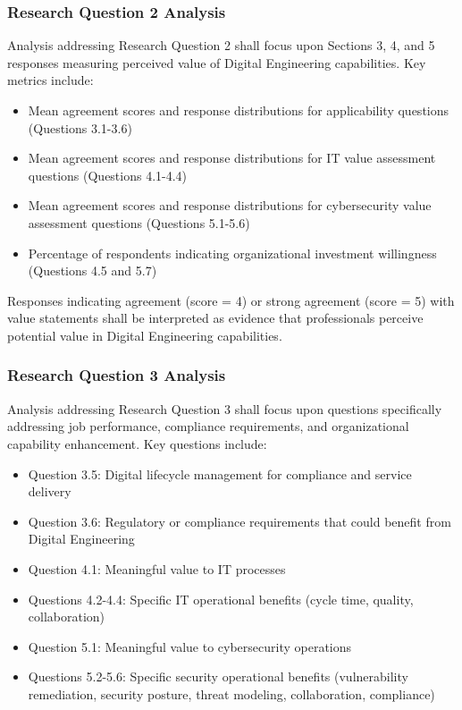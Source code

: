 \subsubsection{Research Question 2 Analysis}

Analysis addressing Research Question 2 shall focus upon Sections 3, 4, and 5 responses measuring perceived value of Digital Engineering capabilities. Key metrics include:

\begin{itemize}
  \item Mean agreement scores and response distributions for applicability questions (Questions 3.1-3.6)
  \item Mean agreement scores and response distributions for IT value assessment questions (Questions 4.1-4.4)
  \item Mean agreement scores and response distributions for cybersecurity value assessment questions (Questions 5.1-5.6)
  \item Percentage of respondents indicating organizational investment willingness (Questions 4.5 and 5.7)
\end{itemize}

Responses indicating agreement (score = 4) or strong agreement (score = 5) with value statements shall be interpreted as evidence that professionals perceive potential value in Digital Engineering capabilities.

\subsubsection{Research Question 3 Analysis}

Analysis addressing Research Question 3 shall focus upon questions specifically addressing job performance, compliance requirements, and organizational capability enhancement. Key questions include:

\begin{itemize}
  \item Question 3.5: Digital lifecycle management for compliance and service delivery
  \item Question 3.6: Regulatory or compliance requirements that could benefit from Digital Engineering
  \item Question 4.1: Meaningful value to IT processes
  \item Questions 4.2-4.4: Specific IT operational benefits (cycle time, quality, collaboration)
  \item Question 5.1: Meaningful value to cybersecurity operations
  \item Questions 5.2-5.6: Specific security operational benefits (vulnerability remediation, security posture, threat modeling, collaboration, compliance)
\end{itemize}

